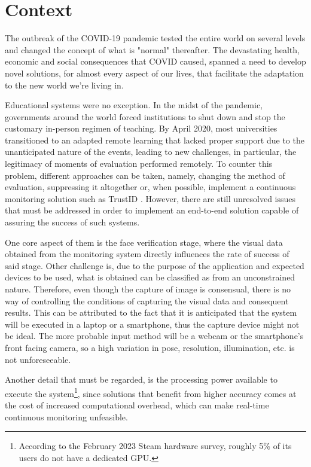 \documentclass[class=report, crop=false, a4paper, 12pt]{standalone}
\begin{document}
\section{Context}
The outbreak of the COVID-19 pandemic tested the entire world on several levels and changed the concept of what is "normal" thereafter. The devastating health, economic and social consequences that COVID caused, spanned a need to develop novel solutions, for almost every aspect of our lives, that facilitate the adaptation to the new world we're living in. 

\par Educational systems were no exception. In the midst of the pandemic, governments around the world forced institutions to shut down and stop the customary in-person regimen of teaching. By April 2020, most universities transitioned to an adapted remote learning \autocite{winsteadRemoteMicroelectronicsLaboratory2022} that lacked proper support due to the unanticipated nature of the events, leading to new challenges, in particular, the legitimacy of moments of evaluation performed remotely. To counter this problem, different approaches can be taken, namely, changing the method of evaluation, suppressing it altogether \autocite{barronrodriguezRemoteLearningGlobal2021} or, when possible, implement a continuous monitoring solution such as TrustID \autocite{fariaImagebasedFaceVerification2023}. However, there are still unresolved issues that must be addressed in order to implement an end-to-end solution capable of assuring the success of such systems. 

\par One core aspect of them is the face verification stage, where the visual data obtained from the monitoring system directly influences the rate of success of said stage. Other challenge is, due to the purpose of the application and expected devices to be used, what is obtained can be classified as from an unconstrained nature. Therefore, even though the capture of image is consensual, there is no way of controlling the conditions of capturing the visual data and consequent results. This can be attributed to the fact that it is anticipated that the system will be executed in a laptop or a smartphone, thus the capture device might not be ideal. The more probable input method will be a webcam or the smartphone's front facing camera, so a high variation in pose, resolution, illumination, etc. is not unforeseeable. 

\par Another detail that must be regarded, is the processing power available to execute the system\footnote{According to the February 2023 Steam hardware survey, roughly 5\% of its users do not have a dedicated GPU.}, since solutions that benefit from higher accuracy comes at the cost of increased computational overhead, which can make real-time continuous monitoring unfeasible.
\end{document}
